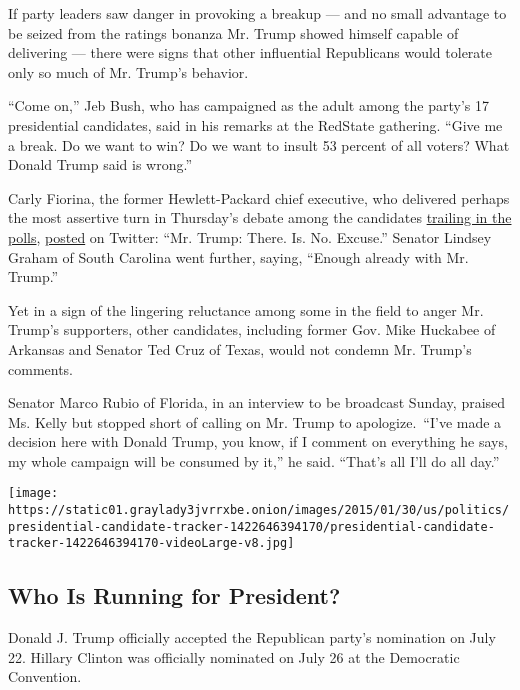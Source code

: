 If party leaders saw danger in provoking a breakup --- and no small
advantage to be seized from the ratings bonanza Mr. Trump showed himself
capable of delivering --- there were signs that other influential
Republicans would tolerate only so much of Mr. Trump's behavior.

``Come on,'' Jeb Bush, who has campaigned as the adult among the party's
17 presidential candidates, said in his remarks at the RedState
gathering. ``Give me a break. Do we want to win? Do we want to insult 53
percent of all voters? What Donald Trump said is wrong.''

Carly Fiorina, the former Hewlett-Packard chief executive, who delivered
perhaps the most assertive turn in Thursday's debate among the
candidates
\href{http://www.nytimes3xbfgragh.onion/2015/08/07/us/politics/before-main-republican-debate-bottom-7-contenders-put-on-brave-faces.html}{trailing
in the polls},
\href{https://twitter.com/CarlyFiorina/status/629860026916716545}{posted}
on Twitter: ``Mr. Trump: There. Is. No. Excuse.'' Senator Lindsey Graham
of South Carolina went further, saying, ``Enough already with Mr.
Trump.''

Yet in a sign of the lingering reluctance among some in the field to
anger Mr. Trump's supporters, other candidates, including former Gov.
Mike Huckabee of Arkansas and Senator Ted Cruz of Texas, would not
condemn Mr. Trump's comments.

Senator Marco Rubio of Florida, in an interview to be broadcast Sunday,
praised Ms. Kelly but stopped short of calling on Mr. Trump to
apologize.~``I've made a decision here with Donald Trump, you know, if I
comment on everything he says, my whole campaign will be consumed by
it,'' he said. ``That's all I'll do all day.''

\href{https://www.nytimes3xbfgragh.onion/interactive/2016/us/elections/2016-presidential-candidates.html}{}

\texttt{[image: https://static01.graylady3jvrrxbe.onion/images/2015/01/30/us/politics/presidential-candidate-tracker-1422646394170/presidential-candidate-tracker-1422646394170-videoLarge-v8.jpg]}

\hypertarget{who-is-running-for-president}{%
\subsection{Who Is Running for
President?}\label{who-is-running-for-president}}

Donald J. Trump officially accepted the Republican party's nomination on
July 22. Hillary Clinton was officially nominated on July 26 at the
Democratic Convention.

